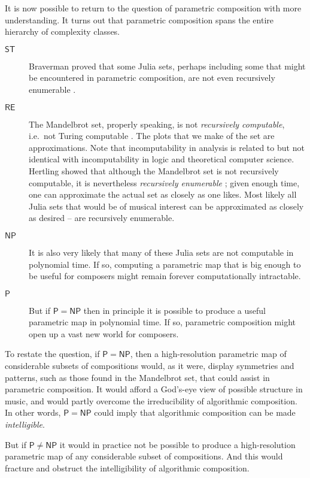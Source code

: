 \documentclass[11pt]{scrartcl}
\begin{document}
It is now possible to return to the question of parametric composition with more understanding. It turns out that parametric composition spans the entire hierarchy of complexity classes.

\begin{description}
\item[$\mathsf{ST}$]  Braverman proved that some Julia sets, perhaps including some that might be encountered in parametric composition, are not even recursively enumerable \parencite{braverman2006non, braverman2009computability}.
\item[$\mathsf{RE}$] The Mandelbrot set, properly speaking, is not \emph{recursively computable}, i.e.\ not Turing computable \parencite{blum1993godel}. The plots that we make of the set are approximations. Note that incomputability in analysis is related to but not identical with incomputability in logic and theoretical computer science. Hertling showed that although the  Mandelbrot set is not recursively computable, it is nevertheless \emph{recursively enumerable} \parencite{Hertling2005-HERITM-3}; given enough time, one can approximate the actual set as closely as one likes. Most likely all Julia sets that would be of musical interest can be approximated as closely as desired -- are recursively enumerable.
\item[$\mathsf{NP}$] It is also very likely that many of these Julia sets are not computable in polynomial time. If so, computing a parametric map that is big enough to be useful for composers might remain forever computationally intractable.
\item[$\mathsf{P}$] But if $\mathsf{P} = \mathsf{NP}$ then in principle it is possible to produce a useful parametric map in polynomial time. If so, parametric composition might open up a vast new world for composers.
\end{description}

To restate the question, if $\mathsf{P} = \mathsf{NP}$, then a high-resolution parametric map of considerable subsets of compositions would, as it were, display symmetries and patterns, such as those found in the Mandelbrot set, that could assist in parametric composition. It would afford a God's-eye view of possible structure in music, and would partly overcome the irreducibility of algorithmic composition. In other words, $\mathsf{P} = \mathsf{NP}$ could imply that algorithmic composition can be made \emph{intelligible}.

But if $\mathsf{P} \ne \mathsf{NP}$ it would in practice not be possible to produce a high-resolution parametric map of any considerable subset of compositions. And this would fracture and obstruct the intelligibility of algorithmic composition.
\end{document}

